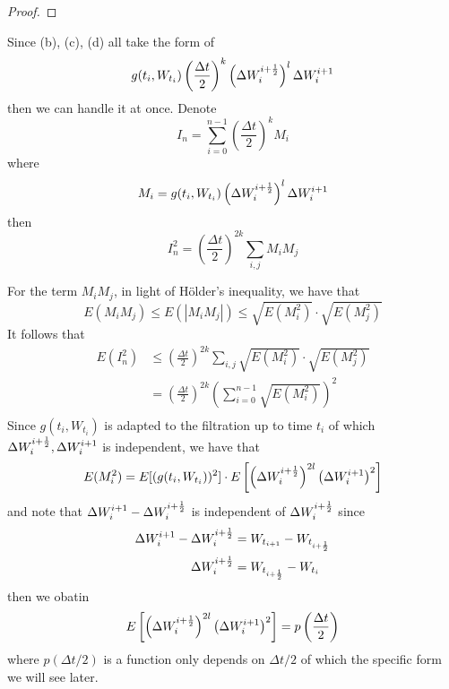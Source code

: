 \documentclass{homework}
\begin{document}
\begin{subproblem}[(\alph*)]
\begin{proof}
        \end{proof}

        \item
        Since (b), (c), (d) all take the form of
        \newcommand{\gt}[1]{g(#1,W_{#1})}
        \newcommand{\increment}{\left(\frac{\Delta t}{2}\right)}
        \[\gt{t_i}\increment^k\left(\dws i\right)^l\dw i\]
        then we can handle it at once.
        Denote
        \[I_n=\sum_{i=0}^{n-1}
        \increment^k M_i\]
        where
        \[M_i=
        \gt{t_i}\left(\dws i\right)^l\dw i\]
        then
        \[
            I_n^2=\increment^{2k}
            \sum_{i,j}M_iM_j
        \]

        For the term $M_iM_j$, in light of H\"older's inequality,
        we have that
        \[E(M_iM_j)\leq E(|M_iM_j|)\leq \sqrt{E(M_i^2)}\cdot\sqrt{E(M_j^2)}\]
        It follows that
        \begin{equation}
            \label{eq:EIn2<=}
            \begin{aligned}
            E(I_n^2)&\leq
            \increment^{2k}
            \sum_{i,j}\sqrt{E(M_i^2)}\cdot\sqrt{E(M_j^2)}\\
        &=\increment^{2k}\left(\sum_{i=0}^{n-1}\sqrt{E(M_i^2)}\right)^2\\
        \end{aligned}\end{equation}
        Since $\gt{t_i}$ is adapted to the filtration up to time $t_i$
        of which $\Delta W_{i}^{i+\frac{1}{2}},\Delta W_{i}^{i+1}$ is independent, we have that
        \begin{equation}
            \label{eq:EMi2}
            E(M_i^2)=E[(\gt{t_i})^2]\cdot
            E\left[\left(\dws i\right)^{2l}\left(\dw i\right)^2\right]
        \end{equation}
        and note that $\Delta W_{i}^{i+1}-\Delta W_{i}^{i+\frac{1}{2}}$ is independent of $\Delta W_{i}^{i+\frac{1}{2}}$ 
        since
        \[\begin{aligned}
            \Delta W_{i}^{i+1}-\Delta W_{i}^{i+\frac{1}{2}}&=W_{t_{i+1}}-W_{t_{i+\frac{1}{2}}}\\
            \Delta W_{i}^{i+\frac{1}{2}}&=W_{t_{i+\frac{1}{2}}}-W_{t_i}
        \end{aligned}\]
        then we obatin
        \[
            E\left[
            \left(\Delta W_{i}^{i+\frac{1}{2}}\right)^{2l}
            \left(\Delta W_{i}^{i+1}\right)^2
            \right]
            =p\left(\frac{\Delta t}{2}\right)
        \]
        where $p(\Delta t/2)$ is a function only depends on $\Delta t/2$
        of which the specific form we will see later.


\end{subproblem}
\end{document}
